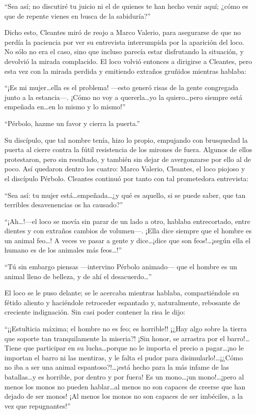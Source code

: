 \documentclass[11pt,openany]{book}
\begin{document}
“Sea así; no discutiré tu juicio ni el de quienes te han hecho venir aquí; ¿cómo es que de repente vienes en busca de la sabiduría?” 

Dicho esto, Cleantes miró de reojo a Marco Valerio, para asegurarse de que no perdía la paciencia por ver su entrevista interrumpida por la aparición del loco. No sólo no era el caso, sino que incluso parecía estar disfrutando la situación, y devolvió la mirada complacido. El loco volvió entonces a dirigirse a Cleantes, pero esta vez con la mirada perdida y emitiendo extraños gruñidos mientras hablaba: 

“¡Es mi mujer\dots ella es el problema! —esto generó risas de la gente congregada junto a la estancia—. ¡Cómo no voy a quererla\dots yo la quiero\dots pero siempre está empeñada en\dots en lo mismo y lo mismo!” 

“Pérbolo, hazme un favor y cierra la puerta.” 

Su discípulo, que tal nombre tenía, hizo lo propio, empujando con brusquedad la puerta al cierre contra la fútil resistencia de los mirones de fuera. Algunos de ellos protestaron, pero sin resultado, y también sin dejar de avergonzarse por ello al de poco. Así quedaron dentro los cuatro: Marco Valerio, Cleantes, el loco piojoso y el discípulo Pérbolo. Cleantes continuó por tanto con tal prometedora entrevista: 

“Sea así: tu mujer está\dots empeñada\dots ¿y qué es aquello, si se puede saber, que tan terribles desavenencias os ha causado?” 

“¡Ah\dots!—el loco se movía sin parar de un lado a otro, hablaba entrecortado, entre dientes y con extraños cambios de volumen—. ¡Ella dice siempre que el hombre es un animal feo\dots! A veces ve pasar a gente y dice\dots ¡dice que son feos!\dots ¡según ella el humano es de los animales más feos\dots!” 

“Tú sin embargo piensas —intervino Pérbolo animado— que el hombre es un animal lleno de belleza, y de ahí el desacuerdo\dots” 

El loco se le puso delante; se le acercaba mientras hablaba, compartiéndole su fétido aliento y haciéndole retroceder espantado y, naturalmente, rebosante de creciente indignación. Sin casi poder contener la risa le dijo: 

“¡¡Estulticia máxima; el hombre no es feo; es horrible!! ¡¿Hay algo sobre la tierra que soporte tan tranquilamente la miseria?! ¡Sin honor, se arrastra por el barro!\dots Tiene que participar en su lucha\dots porque no le importa el precio a pagar\dots ¡no le importan el barro ni las mentiras, y le falta el pudor para disimularlo!\dots ¡¿Cómo no iba a ser una animal espantoso?!\dots ¡está hecho para la más infame de las batallas\dots y es horrible, por dentro y por fuera! Es un mono\dots ¡un mono!\dots ¡pero al menos los monos no pueden hablar\dots al menos no son capaces de creerse que han dejado de ser monos! ¡Al menos los monos no son capaces de ser imbéciles, a la vez que repugnantes!” 
\end{document}
